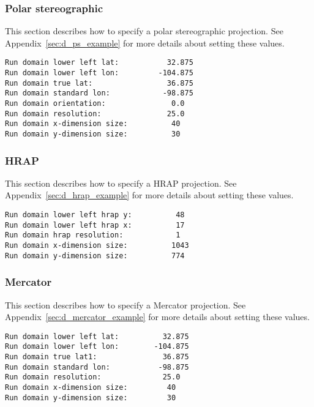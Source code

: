  
 \subsubsection{Polar stereographic} \label{sssec:run_ps}
 This section describes how to specify a polar stereographic
 projection.
 See Appendix~\ref{sec:d_ps_example} for more details about
 setting these values.
 

 \begin{Verbatim}[frame=single]
Run domain lower left lat:           32.875
Run domain lower left lon:         -104.875
Run domain true lat:                 36.875
Run domain standard lon:            -98.875
Run domain orientation:               0.0
Run domain resolution:               25.0
Run domain x-dimension size:          40
Run domain y-dimension size:          30
 \end{Verbatim}

 
 \subsubsection{HRAP} \label{sssec:run_hrap}
 This section describes how to specify a HRAP 
 projection.
 See Appendix~\ref{sec:d_hrap_example} for more details about
 setting these values.

 

 \begin{Verbatim}[frame=single]
Run domain lower left hrap y:          48
Run domain lower left hrap x:          17
Run domain hrap resolution:            1
Run domain x-dimension size:          1043
Run domain y-dimension size:          774
 \end{Verbatim}

 
 \subsubsection{Mercator} \label{sssec:run_mercator}
 This section describes how to specify a Mercator
 projection.
 See Appendix~\ref{sec:d_mercator_example} for more details about
 setting these values.
 

 \begin{Verbatim}[frame=single]
Run domain lower left lat:          32.875
Run domain lower left lon:        -104.875
Run domain true lat1:               36.875
Run domain standard lon:           -98.875
Run domain resolution:              25.0
Run domain x-dimension size:         40
Run domain y-dimension size:         30
 \end{Verbatim}



